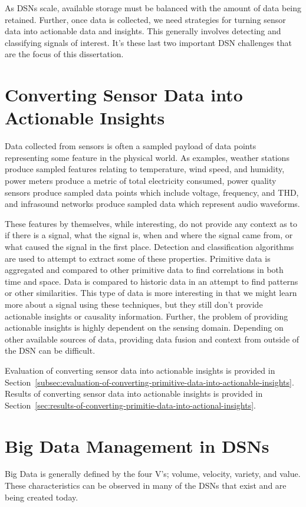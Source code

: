 As DSNs scale, available storage must be balanced with the amount of data being retained. Further, once data is collected, we need strategies for turning sensor data into actionable data and insights. This generally involves detecting and classifying signals of interest. It's these last two important DSN challenges that are the focus of this dissertation.

\section{Converting Sensor Data into Actionable Insights}\label{sec:converting-sensor-data-into-actionable-insights}
Data collected from sensors is often a sampled payload of data points representing some feature in the physical world. As examples, weather stations produce sampled features relating to temperature, wind speed, and humidity, power meters produce a metric of total electricity consumed, power quality sensors produce sampled data points which include voltage, frequency, and THD, and infrasound networks produce sampled data which represent audio waveforms.

These features by themselves, while interesting, do not provide any context as to if there is a signal, what the signal is, when and where the signal came from, or what caused the signal in the first place. Detection and classification algorithms are used to attempt to extract some of these properties. Primitive data is aggregated and compared to other primitive data to find correlations in both time and space. Data is compared to historic data in an attempt to find patterns or other similarities. This type of data is more interesting in that we might learn more about a signal using these techniques, but they still don't provide actionable insights or causality information. Further, the problem of providing actionable insights is highly dependent on the sensing domain. Depending on other available sources of data, providing data fusion and context from outside of the DSN can be difficult.

Evaluation of converting sensor data into actionable insights is provided in Section~\ref{subsec:evaluation-of-converting-primitive-data-into-actionable-insights}. Results of converting sensor data into actionable insights is provided in Section~\ref{sec:results-of-converting-primitie-data-into-actional-insights}.

\section{Big Data Management in DSNs}\label{sec:big-data-management-in-dsns}
Big Data is generally defined by the four V's; volume, velocity, variety, and value. These characteristics can be observed in many of the DSNs that exist and are being created today.

